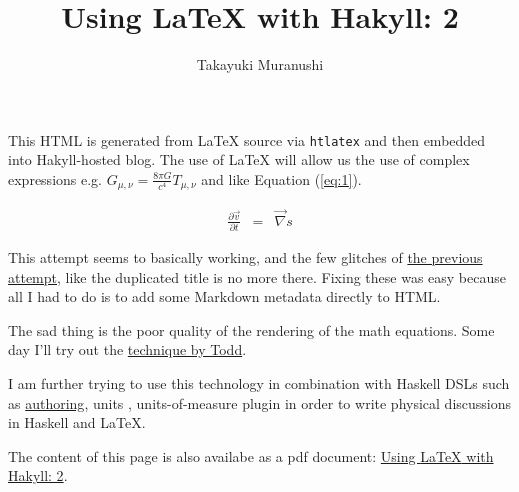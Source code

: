 \documentclass{article}
\title{Using {\LaTeX} with Hakyll: 2}
\author{Takayuki Muranushi}
\begin{document}
\maketitle

This HTML is generated from {\LaTeX} source via {\tt htlatex}
and then embedded into Hakyll-hosted blog. The use of LaTeX will allow us the use of
complex expressions e.g. $G_{\mu,\nu}=\frac{8\pi G}{c^4}T_{\mu,\nu}$ and like Equation (\ref{eq:1}).

\begin{eqnarray}
\frac{\partial{\vec v}}{\partial t} &=& \vec \nabla s \label{eq:1}
\end{eqnarray}



This attempt seems to basically working, and the few
glitches of
\href{http://nushio3.github.io/posts/2014-10-09-LaTeX2HTML/post/post.html}{the previous attempt},
like the duplicated title is no more there. Fixing these was easy because
all I had to do is to add some Markdown metadata directly to HTML.

The sad thing is the poor quality of the rendering of the math equations. Some day I'll try out the
\href{http://tex.stackexchange.com/questions/44486/pixel-perfect-vertical-alignment-of-image-rendered-tex-snippets}{technique by Todd}.


I am further trying to use this technology in combination with Haskell
DSLs such as
\href{http://hackage.haskell.org/package/authoring}{authoring},
units \citep{muranushi2014experience} ,
units-of-measure plugin \citep{gundry2015typechecker}
in order to write
physical discussions in Haskell and LaTeX.


%
%
%


The content of this page is also availabe as a pdf document:
\href{http://nushio3.github.io/posts/2015-07-03-HTLaTeX/dist/post.pdf}{Using {\LaTeX} with Hakyll: 2}.
\end{document}

